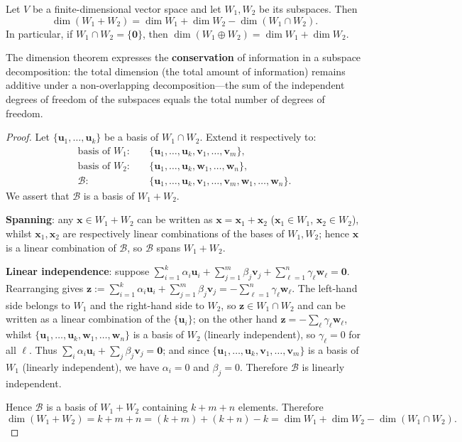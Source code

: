 \begin{theorem}\label{thm:dimension_conservation}
Let $V$ be a finite-dimensional vector space and let $W_1, W_2$ be its subspaces. Then
\[
\dim(W_1 + W_2) = \dim W_1 + \dim W_2 - \dim(W_1 \cap W_2).
\]
In particular, if $W_1 \cap W_2 = \{\mathbf{0}\}$, then $\dim(W_1 \oplus W_2) = \dim W_1 + \dim W_2$.

The dimension theorem expresses the \textbf{conservation} of information in a subspace decomposition: the total dimension (the total amount of information) remains additive under a non-overlapping decomposition---the sum of the independent degrees of freedom of the subspaces equals the total number of degrees of freedom.
\end{theorem}

\begin{proof}
Let $\{\mathbf{u}_1, \dots, \mathbf{u}_k\}$ be a basis of $W_1 \cap W_2$. Extend it respectively to:
\[
\begin{aligned}
\text{basis of } W_1:&\quad \{\mathbf{u}_1, \dots, \mathbf{u}_k, \mathbf{v}_1, \dots, \mathbf{v}_m\}, \\
\text{basis of } W_2:&\quad \{\mathbf{u}_1, \dots, \mathbf{u}_k, \mathbf{w}_1, \dots, \mathbf{w}_n\}, \\
\mathcal{B}:&\quad \{\mathbf{u}_1, \dots, \mathbf{u}_k, \mathbf{v}_1, \dots, \mathbf{v}_m, \mathbf{w}_1, \dots, \mathbf{w}_n\}.
\end{aligned}
\]
We assert that $\mathcal{B}$ is a basis of $W_1 + W_2$.

\textbf{Spanning}: any $\mathbf{x} \in W_1 + W_2$ can be written as $\mathbf{x} = \mathbf{x}_1 + \mathbf{x}_2$ ($\mathbf{x}_1 \in W_1$, $\mathbf{x}_2 \in W_2$), whilst $\mathbf{x}_1, \mathbf{x}_2$ are respectively linear combinations of the bases of $W_1, W_2$; hence $\mathbf{x}$ is a linear combination of $\mathcal{B}$, so $\mathcal{B}$ spans $W_1 + W_2$.

\textbf{Linear independence}: suppose $\sum_{i=1}^k \alpha_i \mathbf{u}_i + \sum_{j=1}^m \beta_j \mathbf{v}_j + \sum_{\ell=1}^n \gamma_\ell \mathbf{w}_\ell = \mathbf{0}$. Rearranging gives $\mathbf{z} := \sum_{i=1}^k \alpha_i \mathbf{u}_i + \sum_{j=1}^m \beta_j \mathbf{v}_j = -\sum_{\ell=1}^n \gamma_\ell \mathbf{w}_\ell$. The left-hand side belongs to $W_1$ and the right-hand side to $W_2$, so $\mathbf{z} \in W_1 \cap W_2$ and can be written as a linear combination of the $\{\mathbf{u}_i\}$; on the other hand $\mathbf{z} = -\sum_{\ell} \gamma_\ell \mathbf{w}_\ell$, whilst $\{\mathbf{u}_1, \dots, \mathbf{u}_k, \mathbf{w}_1, \dots, \mathbf{w}_n\}$ is a basis of $W_2$ (linearly independent), so $\gamma_\ell = 0$ for all $\ell$. Thus $\sum_i \alpha_i \mathbf{u}_i + \sum_j \beta_j \mathbf{v}_j = \mathbf{0}$; and since $\{\mathbf{u}_1, \dots, \mathbf{u}_k, \mathbf{v}_1, \dots, \mathbf{v}_m\}$ is a basis of $W_1$ (linearly independent), we have $\alpha_i = 0$ and $\beta_j = 0$. Therefore $\mathcal{B}$ is linearly independent.

Hence $\mathcal{B}$ is a basis of $W_1 + W_2$ containing $k + m + n$ elements. Therefore
\[
\dim(W_1 + W_2) = k + m + n = (k+m) + (k+n) - k = \dim W_1 + \dim W_2 - \dim(W_1 \cap W_2).
\]
\end{proof}

